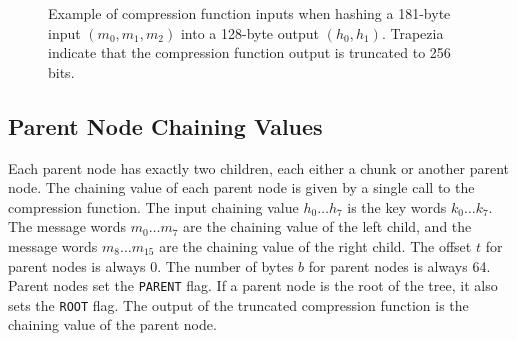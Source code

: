 \documentclass[11pt,notitlepage,a4paper]{article}
\begin{document}
\begin{figure}
\caption{Example of compression function inputs when hashing a 181-byte input $(m_0, m_1, m_2)$ into a 128-byte output $(h_0, h_1)$. Trapezia indicate that the compression function output is truncated to 256 bits.}\label{fig:chunk}
\end{figure}

\subsection{Parent Node Chaining Values}\label{sec:parent}

Each parent node has exactly two children, each either a chunk or another
parent node. The chaining value of each parent node is given by a single call
to the compression function. The input chaining value $h_{0} \ldots h_{7}$ is
the key words $k_{0} \ldots k_{7}$. The message words $m_{0} \ldots m_{7}$ are
the chaining value of the left child, and the message words $m_{8} \ldots
m_{15}$ are the chaining value of the right child. The offset $t$ for parent
nodes is always 0. The number of bytes $b$ for parent nodes is always 64.
Parent nodes set the \texttt{PARENT} flag. If a parent node is the root of the
tree, it also sets the \texttt{ROOT} flag. The output of the truncated
compression function is the chaining value of the parent node.
\end{document}
